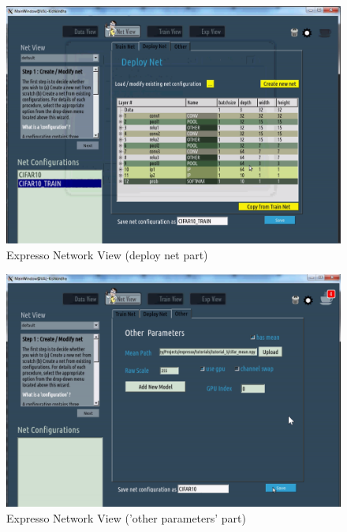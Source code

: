 \begin{figure}[!ht]
\center
    \includegraphics[scale=0.9]{images_expresso/03_net_deploy_net.png}
    \caption{Expresso Network View (deploy net part)}
\end{figure}

\begin{figure}[!ht]
\center
    \includegraphics[scale=0.9]{images_expresso/04_net_other.png}
    \caption{Expresso Network View ('other parameters' part)}
\end{figure}

